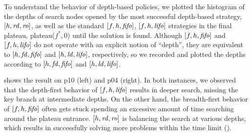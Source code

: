 To understand the behavior of depth-based policies, we plotted the histogram of
the depths of search nodes opened by
the most successful depth-based strategy, $[h,{\mbox{\textit{rd}}},{\mbox{\textit{ro}}}]$, as well as 
the standard $[f,h,{\mbox{\textit{fifo}}}]$, $[f,h,{\mbox{\textit{lifo}}}]$ strategies
in the final plateau, plateau($f^*,0$) until the solution is found.
% 
Although $[f,h,{\mbox{\textit{fifo}}}]$ and $[f,h,{\mbox{\textit{lifo}}}]$ do not operate with an explicit notion of ``depth'', 
they are equivalent to $[h,{\mbox{\textit{fd}}},{\mbox{\textit{fifo}}}]$ and $[h,{\mbox{\textit{ld}}},{\mbox{\textit{lifo}}}]$, respectively,
so we recorded and plotted the depths according to  $[h,{\mbox{\textit{fd}}},{\mbox{\textit{fifo}}}]$ and $[h,{\mbox{\textit{ld}}},{\mbox{\textit{lifo}}}]$.


 shows the result
on
  p10 (left) and
  p04 (right).
In both instances, 
we observed that the depth-first behavior of $[f,h,{\mbox{\textit{lifo}}}]$ results in 
deeper search, missing the key branch at intermediate depths.
On the other hand, the breadth-first behavior of $[f,h,{\mbox{\textit{fifo}}}]$ often gets stuck spending an excessive amount of time searching around the plateau entrance.
$[h,{\mbox{\textit{rd}}},{\mbox{\textit{ro}}}]$ is balancing the search at various depths, which results in successfully solving more problems within the time limit (). %



